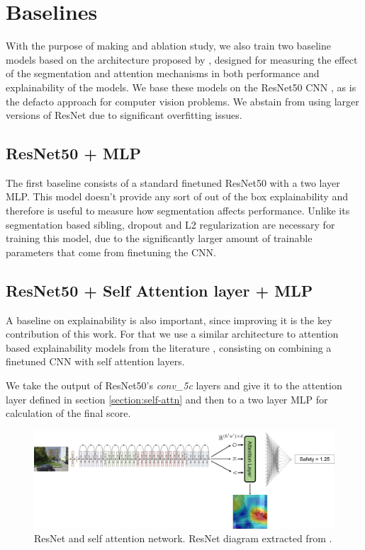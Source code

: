 \section{Baselines}
\label{sec:baselines}
With the purpose of making and ablation study, we also train two baseline models
based on the architecture proposed by , designed for
measuring the effect of the segmentation and attention mechanisms in both performance
and explainability of the models. We base these models on the ResNet50 CNN \cite{he_resnet},
as is the defacto approach for computer vision problems. We abstain from using larger
versions of ResNet due to significant overfitting issues.

\subsection{ResNet50 + MLP}
The first baseline consists of a standard finetuned ResNet50 with a two layer MLP. This
model doesn't provide any sort of out of the box explainability and therefore is useful
to measure how segmentation affects performance.
Unlike its segmentation based sibling, dropout and L2 regularization are necessary for training
this model, due to the significantly larger amount of trainable parameters that come from finetuning the CNN.

\subsection{ResNet50 + Self Attention layer + MLP}

A baseline on explainability is also important, since improving it is the key contribution
of this work. For that we use a similar architecture to attention based explainability
models from the literature \cite{zhang_interpretable, cordonnier_relationship, bello_attention}, consisting on
combining a finetuned CNN with self attention layers.

We take the output of ResNet50's \textit{conv\_5c} layers and give it to the attention layer
defined in section \ref{section:self-attn} and then to a two layer MLP for calculation of the final score.

\begin{figure}[ht]
	\begin{center}
	\includegraphics[width=1\textwidth]{./figures/attn_baseline.png}
	\caption[ResNet + SelfAttention]{ResNet and self attention network. ResNet diagram extracted from .}
	\label{fig:attn_resnet}
	\end{center}
\end{figure}